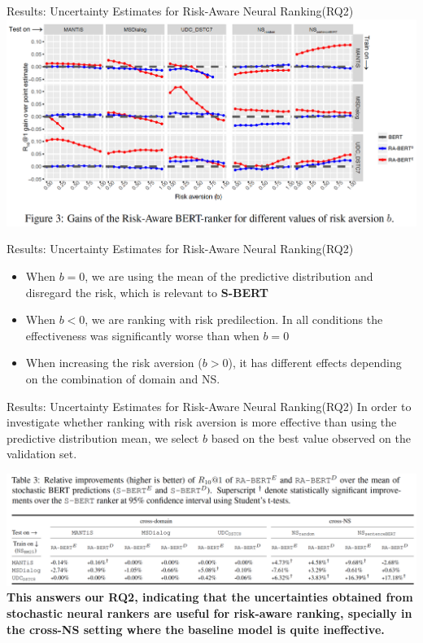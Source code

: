 \documentclass{beamer}
\begin{document}
\begin{frame}{Results: Uncertainty Estimates for Risk-Aware Neural Ranking(RQ2)}
    \includegraphics[scale=0.4]{figure3.png}
    
\end{frame}
\begin{frame}{Results: Uncertainty Estimates for Risk-Aware Neural Ranking(RQ2)}
    
    \begin{itemize}
        \item When $b = 0$, we are using the mean of the predictive distribution and disregard the risk, which is relevant to \textbf{S-BERT}
        \item When $b < 0$, we are ranking with risk predilection. In all conditions the effectiveness was significantly worse than when $b = 0$
        \item When increasing the risk aversion ($b > 0$), it has different effects depending on the combination of domain and NS.
    \end{itemize}
\end{frame}

\begin{frame}{Results: Uncertainty Estimates for Risk-Aware Neural Ranking(RQ2)}
In order to investigate whether ranking with risk aversion is more effective than using the predictive distribution mean, we select $b$ based on the best value observed on the validation set.

\includegraphics[scale=0.33]{table3.png}
\textbf{This answers our RQ2, indicating that the uncertainties obtained from stochastic neural rankers are useful for risk-aware ranking, specially in the cross-NS setting where the baseline model is quite ineffective.}
\end{frame}
\end{document}
